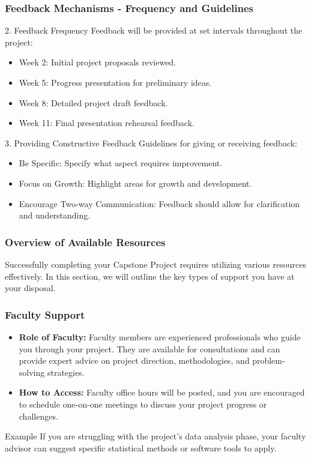 \documentclass[aspectratio=169]{beamer}
\begin{document}
\begin{frame}[fragile]
  \frametitle{Feedback Mechanisms - Frequency and Guidelines}
  \begin{block}{2. Feedback Frequency}
    Feedback will be provided at set intervals throughout the project:
    \begin{itemize}
      \item Week 2: Initial project proposals reviewed.
      \item Week 5: Progress presentation for preliminary ideas.
      \item Week 8: Detailed project draft feedback.
      \item Week 11: Final presentation rehearsal feedback.
    \end{itemize}
  \end{block}

  \begin{block}{3. Providing Constructive Feedback}
    Guidelines for giving or receiving feedback:
    \begin{itemize}
      \item Be Specific: Specify what aspect requires improvement.
      \item Focus on Growth: Highlight areas for growth and development.
      \item Encourage Two-way Communication: Feedback should allow for clarification and understanding.
    \end{itemize}
  \end{block}
\end{frame}

\begin{frame}[fragile]
    \frametitle{Overview of Available Resources}
    Successfully completing your Capstone Project requires utilizing various resources effectively. In this section, we will outline the key types of support you have at your disposal.
\end{frame}

\begin{frame}[fragile]
    \frametitle{Faculty Support}
    \begin{itemize}
        \item \textbf{Role of Faculty:} Faculty members are experienced professionals who guide you through your project. They are available for consultations and can provide expert advice on project direction, methodologies, and problem-solving strategies.
        \item \textbf{How to Access:} Faculty office hours will be posted, and you are encouraged to schedule one-on-one meetings to discuss your project progress or challenges.
    \end{itemize}
    
    \begin{block}{Example}
        If you are struggling with the project's data analysis phase, your faculty advisor can suggest specific statistical methods or software tools to apply.
    \end{block}
\end{frame}
\end{document}
